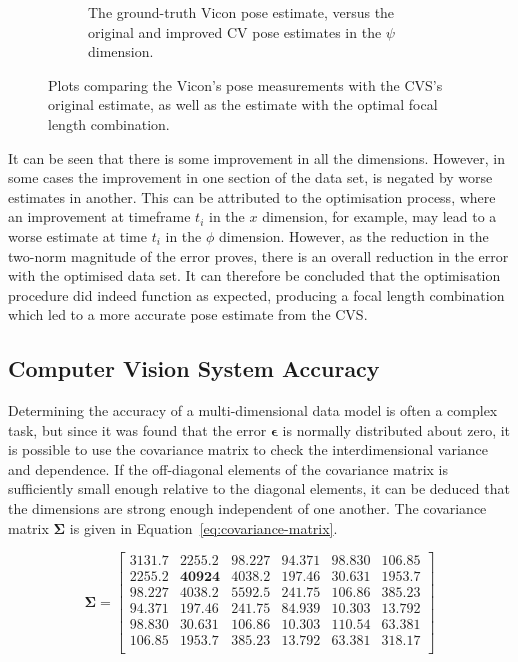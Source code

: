 \begin{figure}
\begin{subfigure}{0.45\textwidth}
    \caption{The ground-truth Vicon pose estimate, versus the original and improved CV pose estimates in the $\psi$ dimension.}
  \label{fig:estimate-yaw}
  \end{subfigure}
  \caption[Plots comparing the Vicon's measurements with the CVS's original and improved measurements. ]{Plots comparing the Vicon's pose measurements with the CVS's original estimate, as well as the estimate with the optimal focal length combination.}
  \label{fig:estimate}
\end{figure}

It can be seen that there is some improvement in all the dimensions. However, in some cases the improvement in one section of the data set, is negated by worse estimates in another. This can be attributed to the optimisation process, where an improvement at timeframe $t_i$ in the $x$ dimension, for example, may lead to a worse estimate at time $t_i$ in the $\phi$ dimension. However, as the reduction in the two-norm magnitude of the error proves, there is an overall reduction in the error with the optimised data set. It can therefore be concluded that the optimisation procedure did indeed function as expected, producing a focal length combination which led to a more accurate pose estimate from the CVS. 

\subsection{Computer Vision System Accuracy}

Determining the accuracy of a multi-dimensional data model is often a complex task, but since it was found that the error $\bm{\epsilon}$ is normally distributed about zero, it is possible to use the covariance matrix to check the interdimensional variance and dependence. If the off-diagonal elements of the covariance matrix is sufficiently small enough relative to the diagonal elements, it can be deduced that the dimensions are strong enough independent of one another. The covariance matrix $\bm{\Sigma}$ is given in Equation~\ref{eq:covariance-matrix}. 

\begin{equation}
  \label{eq:covariance-matrix}
  \bm{\Sigma} = 
  \begin{bmatrix}
    \bm{3131.7} & 2255.2 & 98.227 & 94.371 &  98.830 & 106.85 \\ 
    2255.2 & \bm{40924}  & 4038.2 & 197.46 &  30.631 & 1953.7 \\
    98.227 & 4038.2 & \bm{5592.5} & 241.75 &  106.86 & 385.23 \\
    94.371 & 197.46 & 241.75 & \bm{84.939} &  10.303 & 13.792 \\
    98.830 & 30.631 & 106.86 & 10.303 &  \bm{110.54} & 63.381 \\
    106.85 & 1953.7 & 385.23 & 13.792 &  63.381 & \bm{318.17} \\
  \end{bmatrix}
\end{equation}

